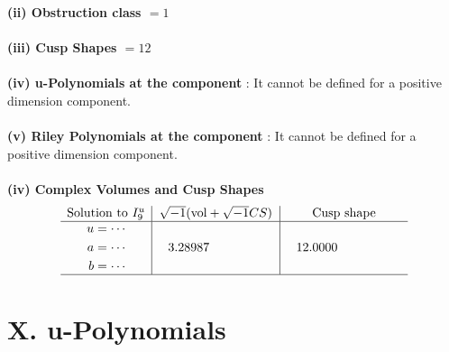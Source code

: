 \documentclass[1p]{elsarticle_modified}
\theoremstyle{definition}
\newcommand{\I}{\sqrt{-1}}
\begin{document}
\flushleft \textbf{(ii) Obstruction class $= 1$}\\~\\
\flushleft \textbf{(iii) Cusp Shapes $= 12$}\\~\\
\flushleft \textbf{(iv) u-Polynomials at the component} : It cannot be defined for a positive dimension component.\\~\\
\flushleft \textbf{(v) Riley Polynomials at the component} : It cannot be defined for a positive dimension component.\\~\\
\newpage\flushleft \textbf{(iv) Complex Volumes and Cusp Shapes}
$$\begin{array}{c|c|c} 
\text{Solution to }I^u_{9}& \I (\text{vol} + \sqrt{-1}CS) & \text{Cusp shape}\\
 \hline 
\begin{aligned}
u &= \cdots \\
a &= \cdots \\
b &= \cdots\end{aligned}
 & \phantom{-}3.28987\phantom{ +0.000000I} & \phantom{-}12.0000\phantom{ +0.000000I}\\
 \hline 
 \end{array}
$$
\newpage\renewcommand{\arraystretch}{1}
\centering \section*{ X. u-Polynomials}
\end{document}
